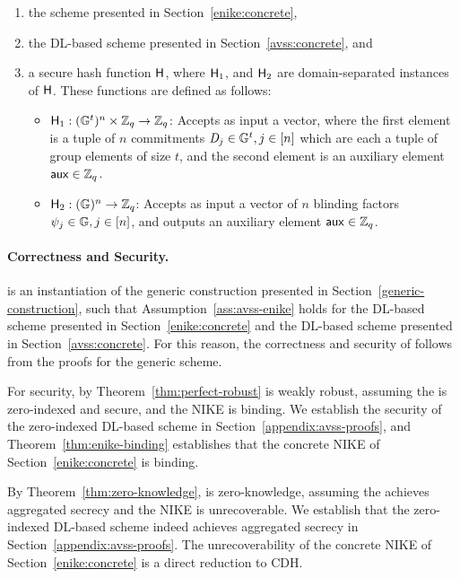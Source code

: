 \begin{enumerate}
  \item the \ENIKE scheme presented in Section~\ref{enike:concrete},
  \item the DL-based \AVSS scheme presented in Section~\ref{avss:concrete}, and
  \item a secure hash function $\mathsf{H}$, where
$\mathsf{H}_1$, and $\mathsf{H}_2$ are domain-separated instances of $\mathsf{H}$.
 These functions are defined as follows:
\begin{itemize}
  \item $\mathsf{H}_1:  (\mathbb{G}^t)^n  \times \mathbb{Z}_q \rightarrow \mathbb{Z}_q$: Accepts as input a vector, where the first element is a tuple
  of $n$ \AVSS commitments $\textit{D}_j \in \mathbb{G}^t, j \in [n]$ which are each a tuple of group elements of size $t$,
  and the second element is an auxiliary element $\mathsf{aux} \in \mathbb{Z}_q$.
\item $\mathsf{H}_2:  (\mathbb{G})^n \rightarrow \mathbb{Z}_q$: Accepts as input a vector
  of $n$ blinding factors $\psi_j \in \mathbb{G}, j \in [n]$,
  and outputs an auxiliary element $\mathsf{aux} \in \mathbb{Z}_q$.
\end{itemize}
\end{enumerate}




\paragraph{Correctness and Security.}
\RG is an instantiation of the generic construction presented in Section~\ref{generic-construction},
such that Assumption~\ref{ass:avss-enike} holds for the DL-based \AVSS scheme presented in Section~\ref{enike:concrete}
and the DL-based \AVSS scheme presented in Section~\ref{avss:concrete}.
For this reason,
the correctness and security of \RG follows from the proofs for the generic scheme.

For security,
by Theorem~\ref{thm:perfect-robust}
\RG is weakly robust,
assuming the \AVSS is zero-indexed and secure,
and the NIKE is binding.
We establish the security of the zero-indexed DL-based \AVSS scheme in Section~\ref{appendix:avss-proofs},
and Theorem~\ref{thm:enike-binding} establishes that the concrete NIKE of Section~\ref{enike:concrete} is binding.

By Theorem~\ref{thm:zero-knowledge},
\RG is zero-knowledge,
assuming the \AVSS achieves aggregated secrecy and the NIKE is unrecoverable.
We establish that the zero-indexed DL-based \AVSS scheme indeed achieves aggregated secrecy in Section~\ref{appendix:avss-proofs}.
The unrecoverability of the concrete NIKE of Section~\ref{enike:concrete} is a direct reduction to CDH.

